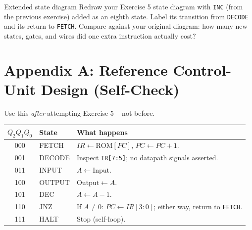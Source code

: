 \documentclass[11pt]{article}
\begin{document}
\begin{drawex}{Extended state diagram}
Redraw your Exercise 5 state diagram with \texttt{INC} (from the previous
exercise) added as an eighth state. Label its transition from \texttt{DECODE}
and its return to \texttt{FETCH}. Compare against your original diagram: how many
new states, gates, and wires did one extra instruction actually cost?
\end{drawex}

\newpage
\section*{Appendix A: Reference Control-Unit Design (Self-Check)}

Use this \emph{after} attempting Exercise 5 -- not before.

\begin{center}
\begin{tabular}{@{}clp{7.6cm}@{}}
\toprule
$Q_2Q_1Q_0$ & \textbf{State} & \textbf{What happens} \\
\midrule
000 & FETCH  & $IR \leftarrow \text{ROM}[PC]$, $PC \leftarrow PC+1$. \\
001 & DECODE & Inspect \texttt{IR[7:5]}; no datapath signals asserted. \\
011 & INPUT  & $A \leftarrow \text{Input}$. \\
100 & OUTPUT & $\text{Output} \leftarrow A$. \\
101 & DEC    & $A \leftarrow A - 1$. \\
110 & JNZ    & If $A \neq 0$: $PC \leftarrow IR[3:0]$; either way, return to \texttt{FETCH}. \\
111 & HALT   & Stop (self-loop). \\
\bottomrule
\end{tabular}
\end{center}
\end{document}
